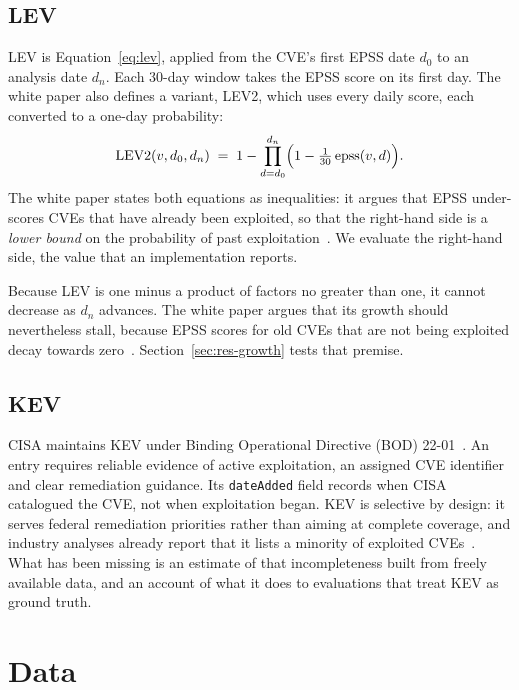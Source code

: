 \subsection{LEV}

LEV is Equation~\eqref{eq:lev}, applied from the CVE's first EPSS date $d_0$ to
an analysis date $d_n$. Each 30-day window takes the EPSS score on its first
day. The white paper also defines a variant, LEV2, which uses every daily score,
each converted to a one-day probability:
\begin{equation}\label{eq:lev2}
\mathrm{LEV2}(v, d_0, d_n) \;=\; 1 - \prod_{d=d_0}^{d_n}
\Bigl(1 - \tfrac{1}{30}\,\mathrm{epss}(v, d)\Bigr).
\end{equation}
The white paper states both equations as inequalities: it argues that EPSS
under-scores CVEs that have already been exploited, so that the right-hand
side is a \emph{lower bound} on the probability of past
exploitation~\cite[Sec.~5]{mell2025lev}. We evaluate the right-hand side, the
value that an implementation reports.

Because LEV is one minus a product of factors no greater than one, it cannot
decrease as $d_n$ advances. The white paper argues that its growth should
nevertheless stall, because EPSS scores for old CVEs that are not being
exploited decay towards zero~\cite[Secs.~6 and~7.2]{mell2025lev}. Section~\ref{sec:res-growth}
tests that premise.

\subsection{KEV}

CISA maintains KEV under Binding Operational Directive (BOD)
22-01~\cite{cisa2022kev}. An entry requires reliable evidence of active
exploitation, an assigned CVE identifier and clear remediation guidance. Its
\texttt{dateAdded} field records when CISA catalogued the CVE, not when
exploitation began. KEV is selective by design: it serves federal remediation
priorities rather than aiming at complete coverage, and industry analyses
already report that it lists a minority of exploited
CVEs~\cite{roytman2026kevparadox,garrity2026state,beardsley2025kevology}. What
has been missing is an estimate of that incompleteness built from freely available data,
and an account of what it does to evaluations that treat KEV as ground truth.

\section{Data}\label{sec:data}


